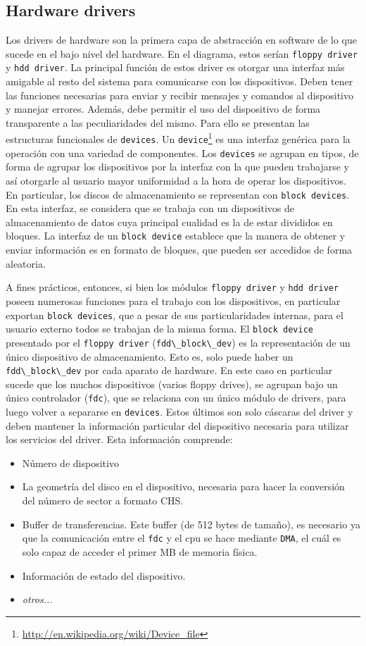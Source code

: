 \documentclass[a4paper]{article}
\newcommand{\func}[1]{\lstinline{#1}}
\begin{document}
\subsection{Hardware drivers}
Los drivers de hardware son la primera capa de abstracción en software de lo que sucede en el bajo nivel del hardware. En el diagrama, estos serían \func{floppy driver} y \func{hdd driver}. La principal función de estos driver es otorgar una interfaz más amigable al resto del sistema para comunicarse con los dispositivos. Deben tener las funciones necesarias para enviar y recibir mensajes y comandos al dispositivo y manejar errores. Además, debe permitir el uso del dispositivo de forma transparente a las peculiaridades del mismo. Para ello se presentan las estructuras funcionales de \func{devices}. Un \func{device}\footnote{\url{http://en.wikipedia.org/wiki/Device_file}} es una interfaz genérica para la operación con una variedad de componentes. Los \func{devices} se agrupan en tipos, de forma de agrupar los dispositivos por la interfaz con la que pueden trabajarse y así otorgarle al usuario mayor uniformidad a la hora de operar los dispositivos. En particular, los discos de almacenamiento se representan con \func{block devices}. En esta interfaz, se considera que se trabaja con un dispositivos de almacenamiento de datos cuya principal cualidad es la de estar divididos en bloques. La interfaz de un \func{block device} establece que la manera de obtener y enviar información es en formato de bloques, que pueden ser accedidos de forma aleatoria. 

A fines prácticos, entonces, si bien los módulos \func{floppy driver} y \func{hdd driver} poseen numerosas funciones para el trabajo con los dispositivos, en particular exportan \func{block devices}, que a pesar de sus particularidades internas, para el usuario externo todos se trabajan de la misma forma. El \func{block device} presentado por el \func{floppy driver} (\func{fdd\_block\_dev}) es la representación de un único dispositivo de almacenamiento. Esto es, solo puede haber un \func{fdd\_block\_dev} por cada aparato de hardware. En este caso en particular sucede que los muchos dispositivos (varios floppy drives), se agrupan bajo un único controlador (\func{fdc}), que se relaciona con un único módulo de drivers, para luego volver a separarse en \func{devices}. Estos últimos son solo cáscaras del driver y deben mantener la información particular del dispositivo necesaria para utilizar los servicios del driver. Esta información comprende: 

\begin{itemize}
 \item Número de dispositivo 
 \item La geometría del disco en el dispositivo, necesaria para hacer la conversión del número de sector a formato CHS.
 \item Buffer de transferencias. Este buffer (de 512 bytes de tamaño), es necesario ya que la comunicación entre el \func{fdc} y el cpu se hace mediante \func{DMA}, el cuál es solo capaz de acceder el primer MB de memoria física. 
 \item Información de estado del dispositivo. 
 \item \emph{otros...}
\end{itemize}
\end{document}

